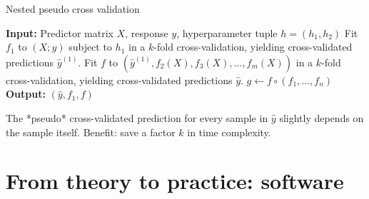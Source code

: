 \documentclass[10pt, aspectratio=169]{beamer}
\begin{document}
\begin{frame}{}
  \begin{algorithm}[H]
    \caption{Nested pseudo cross validation}
    \label{alg:nested-pcv}
    \begin{algorithmic}[1]
      \State  \textbf{Input:} Predictor matrix $X$, response $y$, 
        hyperparameter tuple $h = (h_1, h_2)$
      \State Fit $f_1$ to $(X; y)$ subject to $h_1$ in a $k$-fold cross-validation, 
        yielding cross-validated predictions $\hat{y}^{(1)}$.
      \State Fit $f$ to $(\hat{y}^{(1)}, f_2(X), f_3(X), \ldots, f_m(X))$ in a $k$-fold 
        cross-validation, yielding cross-validated predictions $\hat{y}$.
      \State $g \gets f \circ (f_1, \ldots, f_n)$
      \State \textbf{Output:} $(\hat{y}, f_1, f)$
    \end{algorithmic}
  \end{algorithm}

The *pseudo* cross-validated prediction for every sample in $\hat{y}$ slightly 
depends on the sample itself. Benefit: save a factor $k$ in time complexity.
\end{frame}

\section{From theory to practice: software}
\end{document}
